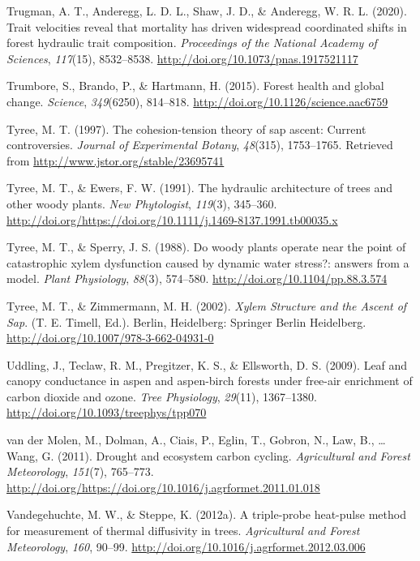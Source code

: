 \documentclass[11pt,twoside]{reedthesis}
\begin{document}
\hypertarget{ref-trugman_trait_2020}{}
Trugman, A. T., Anderegg, L. D. L., Shaw, J. D., \& Anderegg, W. R. L.
(2020). Trait velocities reveal that mortality has driven widespread
coordinated shifts in forest hydraulic trait composition.
\emph{Proceedings of the National Academy of Sciences}, \emph{117}(15),
8532--8538. \url{http://doi.org/10.1073/pnas.1917521117}

\hypertarget{ref-trumbore_forest_2015}{}
Trumbore, S., Brando, P., \& Hartmann, H. (2015). Forest health and
global change. \emph{Science}, \emph{349}(6250), 814--818.
\url{http://doi.org/10.1126/science.aac6759}

\hypertarget{ref-Tyree1997}{}
Tyree, M. T. (1997). The cohesion-tension theory of sap ascent: Current
controversies. \emph{Journal of Experimental Botany}, \emph{48}(315),
1753--1765. Retrieved from \url{http://www.jstor.org/stable/23695741}

\hypertarget{ref-TyreeEwers1991}{}
Tyree, M. T., \& Ewers, F. W. (1991). The hydraulic architecture of
trees and other woody plants. \emph{New Phytologist}, \emph{119}(3),
345--360.
\url{http://doi.org/https://doi.org/10.1111/j.1469-8137.1991.tb00035.x}

\hypertarget{ref-tyree_woody_1988}{}
Tyree, M. T., \& Sperry, J. S. (1988). Do woody plants operate near the
point of catastrophic xylem dysfunction caused by dynamic water stress?:
answers from a model. \emph{Plant Physiology}, \emph{88}(3), 574--580.
\url{http://doi.org/10.1104/pp.88.3.574}

\hypertarget{ref-tyree_xylem_2002}{}
Tyree, M. T., \& Zimmermann, M. H. (2002). \emph{Xylem Structure and the
Ascent of Sap}. (T. E. Timell, Ed.). Berlin, Heidelberg: Springer Berlin
Heidelberg. \url{http://doi.org/10.1007/978-3-662-04931-0}

\hypertarget{ref-Uddling2009}{}
Uddling, J., Teclaw, R. M., Pregitzer, K. S., \& Ellsworth, D. S.
(2009). Leaf and canopy conductance in aspen and aspen-birch forests
under free-air enrichment of carbon dioxide and ozone. \emph{Tree
Physiology}, \emph{29}(11), 1367--1380.
\url{http://doi.org/10.1093/treephys/tpp070}

\hypertarget{ref-Vandermolen2011}{}
van der Molen, M., Dolman, A., Ciais, P., Eglin, T., Gobron, N., Law,
B., \ldots{} Wang, G. (2011). Drought and ecosystem carbon cycling.
\emph{Agricultural and Forest Meteorology}, \emph{151}(7), 765--773.
\url{http://doi.org/https://doi.org/10.1016/j.agrformet.2011.01.018}

\hypertarget{ref-Vandegehuchte2012}{}
Vandegehuchte, M. W., \& Steppe, K. (2012a). A triple-probe heat-pulse
method for measurement of thermal diffusivity in trees.
\emph{Agricultural and Forest Meteorology}, \emph{160}, 90--99.
\url{http://doi.org/10.1016/j.agrformet.2012.03.006}
\end{document}
